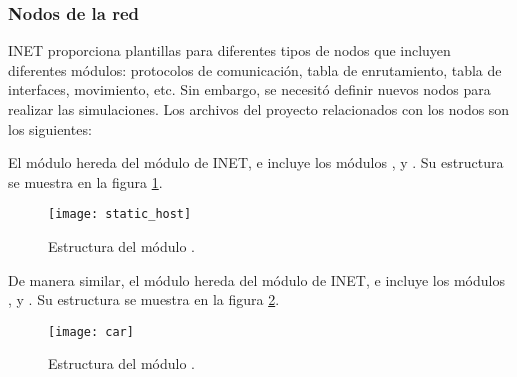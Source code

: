 
\subsubsection{Nodos de la red}

\label{subsubsec:nodos_de_la_red_sim}

INET proporciona plantillas para diferentes tipos de nodos que incluyen
diferentes módulos: protocolos de comunicación, tabla de enrutamiento, tabla de
interfaces, movimiento, etc. Sin embargo, se necesitó definir nuevos nodos para
realizar las simulaciones. Los archivos del proyecto relacionados con los nodos
son los siguientes:


El módulo  hereda del módulo  de INET, e
incluye los módulos ,  y
. Su estructura se muestra en la figura
\ref{fig:static_host}.

\begin{figure}[th!]
\centering
\texttt{[image: static\_host]}
\decoRule
\caption[Estructura del módulo ]{Estructura del módulo
.}
\label{fig:static_host}
\end{figure}

De manera similar, el módulo  hereda del módulo  de
INET, e incluye los módulos ,  y
. Su estructura se muestra en la figura \ref{fig:car}.

\begin{figure}[th!]
\centering
\texttt{[image: car]}
\decoRule
\caption[Estructura del módulo ]{Estructura del módulo .}
\label{fig:car}
\end{figure}

